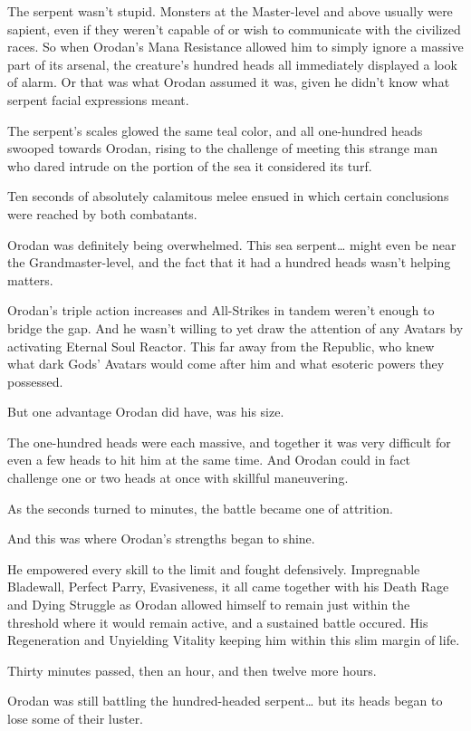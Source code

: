 \documentclass[a4paper,10pt]{book}
\begin{document}
The serpent wasn’t stupid. Monsters at the Master-level and above usually were sapient, even if they weren’t capable of or wish to communicate with the civilized races. So when Orodan’s Mana Resistance allowed him to simply ignore a massive part of its arsenal, the creature’s hundred heads all immediately displayed a look of alarm. Or that was what Orodan assumed it was, given he didn’t know what serpent facial expressions meant.\par
The serpent’s scales glowed the same teal color, and all one-hundred heads swooped towards Orodan, rising to the challenge of meeting this strange man who dared intrude on the portion of the sea it considered its turf.\par
Ten seconds of absolutely calamitous melee ensued in which certain conclusions were reached by both combatants.\par
Orodan was definitely being overwhelmed. This sea serpent… might even be near the Grandmaster-level, and the fact that it had a hundred heads wasn’t helping matters.\par
Orodan’s triple action increases and All-Strikes in tandem weren’t enough to bridge the gap. And he wasn’t willing to yet draw the attention of any Avatars by activating Eternal Soul Reactor. This far away from the Republic, who knew what dark Gods’ Avatars would come after him and what esoteric powers they possessed.\par
But one advantage Orodan did have, was his size.\par
The one-hundred heads were each massive, and together it was very difficult for even a few heads to hit him at the same time. And Orodan could in fact challenge one or two heads at once with skillful maneuvering.\par
As the seconds turned to minutes, the battle became one of attrition.\par
And this was where Orodan’s strengths began to shine.\par
He empowered every skill to the limit and fought defensively. Impregnable Bladewall, Perfect Parry, Evasiveness, it all came together with his Death Rage and Dying Struggle as Orodan allowed himself to remain just within the threshold where it would remain active, and a sustained battle occured. His Regeneration and Unyielding Vitality keeping him within this slim margin of life.\par
Thirty minutes passed, then an hour, and then twelve more hours.\par
Orodan was still battling the hundred-headed serpent… but its heads began to lose some of their luster.\par
\end{document}
